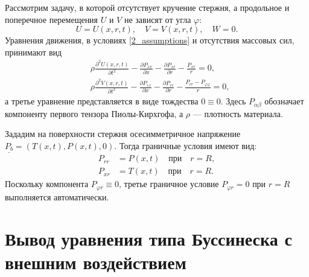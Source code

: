 \documentclass[12pt, a4paper]{report}
\newcommand{\vect}[1]{\underline{#1}}
\newcommand{\pdiff}[2]{\frac{\partial #1}{\partial #2}}
\begin{document}
Рассмотрим задачу, в которой отсутствует кручение стержня, а продольное и поперечное перемещения $U$ и $V$ не зависят от угла $\varphi$:
\begin{equation}\label{2_assumptions}
U = U(x,r,t), \quad V = V(x,r,t), \quad W = 0.
\end{equation}
Уравнения движения, в условиях \eqref{2_assumptions} и отсутствия массовых сил, принимают вид
\begin{align}
\label{2_eq1_0}
&\rho  \frac{\partial^2 U(x,r,t)}{\partial t^2}-\frac{\partial P_{x x}}{\partial x}-\frac{\partial P_{xr}}{\partial r}-\frac{P_{xr}}{r} = 0,\\
\label{2_eq2_0}
&\rho  \frac{\partial^2 V(x,r,t)}{\partial t^2} - \frac{\partial P_{rx}}{\partial x}-\frac{\partial P_{rr}}{\partial r}-\frac{P_{rr} - P_{\varphi\varphi}}{r} = 0,
\end{align}
а третье уравнение представляется в виде тождества $0\equiv 0$. Здесь $P_{\alpha \beta}$ обозначает компоненту первого тензора Пиолы-Кирхгофа, а $\rho$ --- плотность материала.

Зададим на поверхности стержня осесимметричное напряжение $\vect{P_b} = (T(x,t), P(x,t), 0)$. Тогда граничные условия имеют вид:
\begin{align}
P_{rr} &= P(x, t) \quad \mbox{при} \quad r = R \label{2_bc_rr},\\
P_{xr} &= T(x, t) \quad \mbox{при} \quad r = R \label{2_bc_rx}.
\end{align}
Поскольку компонента $ P_{\varphi r} \equiv 0 $, третье граничное условие $P_{\varphi r} = 0$ при $r = R$ выполняется автоматически.



\section{Вывод уравнения типа Буссинеска с внешним воздействием}
\label{sec:derivation}
\end{document}
